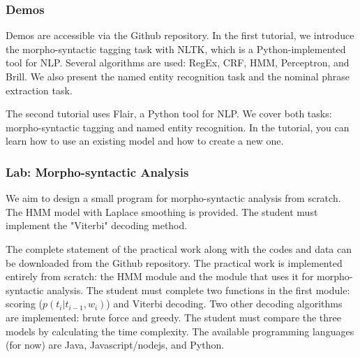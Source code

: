 \documentclass{KBook}
\begin{document}


\subsubsection*{Demos}

Demos are accessible via the Github repository.
In the first tutorial, we introduce the morpho-syntactic tagging task with NLTK, which is a Python-implemented tool for NLP. Several algorithms are used: RegEx, CRF, HMM, Perceptron, and Brill. We also present the named entity recognition task and the nominal phrase extraction task.

The second tutorial uses Flair, a Python tool for NLP. We cover both tasks: morpho-syntactic tagging and named entity recognition. In the tutorial, you can learn how to use an existing model and how to create a new one.

\subsubsection*{Lab: Morpho-syntactic Analysis}

We aim to design a small program for morpho-syntactic analysis from scratch. The HMM model with Laplace smoothing is provided. The student must implement the "Viterbi" decoding method.

The complete statement of the practical work along with the codes and data can be downloaded from the Github repository. The practical work is implemented entirely from scratch: the HMM module and the module that uses it for morpho-syntactic analysis. The student must complete two functions in the first module: scoring ($p(t_i|t_{i-1}, w_i)$) and Viterbi decoding. Two other decoding algorithms are implemented: brute force and greedy. The student must compare the three models by calculating the time complexity. The available programming languages (for now) are Java, Javascript/nodejs, and Python.


%


\ifx\wholebook\relax\else
% 
% 
	
\end{document}
